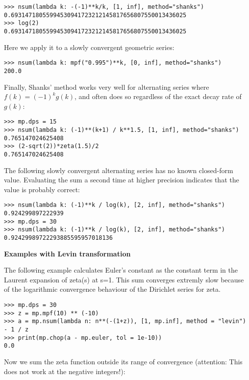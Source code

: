 \begin{lstlisting}
>>> nsum(lambda k: -(-1)**k/k, [1, inf], method="shanks")
0.69314718055994530941723212145817656807550013436025
>>> log(2)
0.69314718055994530941723212145817656807550013436025
\end{lstlisting}

Here we apply it to a slowly convergent geometric series:

\begin{lstlisting}
>>> nsum(lambda k: mpf("0.995")**k, [0, inf], method="shanks")
200.0
\end{lstlisting}

Finally, Shanks' method works very well for alternating series where $f(k)=(-1)^k g(k)$, and often does so regardless of the exact decay rate of $g(k)$:

\begin{lstlisting}
>>> mp.dps = 15
>>> nsum(lambda k: (-1)**(k+1) / k**1.5, [1, inf], method="shanks")
0.765147024625408
>>> (2-sqrt(2))*zeta(1.5)/2
0.765147024625408
\end{lstlisting}

The following slowly convergent alternating series has no known closed-form value. Evaluating the sum a second time at higher precision indicates that the value is probably correct:

\begin{lstlisting}
>>> nsum(lambda k: (-1)**k / log(k), [2, inf], method="shanks")
0.924299897222939
>>> mp.dps = 30
>>> nsum(lambda k: (-1)**k / log(k), [2, inf], method="shanks")
0.92429989722293885595957018136
\end{lstlisting}

\vpara
\textbf{Examples with Levin transformation}

The following example calculates Euler’s constant as the constant term in the Laurent expansion of zeta(s) at s=1. This sum converges extremly slow because of the logarithmic convergence behaviour of the Dirichlet series for zeta.


\begin{lstlisting}
>>> mp.dps = 30
>>> z = mp.mpf(10) ** (-10)
>>> a = mp.nsum(lambda n: n**(-(1+z)), [1, mp.inf], method = "levin") - 1 / z
>>> print(mp.chop(a - mp.euler, tol = 1e-10))
0.0
\end{lstlisting}

Now we sum the zeta function outside its range of convergence (attention: This does not work at the negative integers!):



